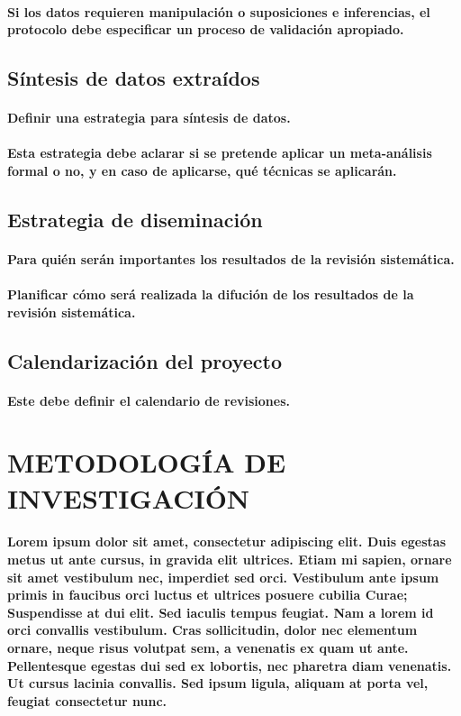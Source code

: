 \documentclass[10pt, twocolumn]{article}
\begin{document}
\paragraph{Si los datos requieren manipulación o suposiciones e inferencias, el protocolo debe especificar un proceso de validación apropiado.}

\subsection{Síntesis de datos extraídos}
\paragraph{Definir una estrategia para síntesis de datos.}
\paragraph{Esta estrategia debe aclarar si se pretende aplicar un meta-análisis formal o no, y en caso de aplicarse, qué técnicas se aplicarán.}

\subsection{Estrategia de diseminación}
\paragraph{Para quién serán importantes los resultados de la revisión sistemática.}
\paragraph{Planificar cómo será realizada la difución de los resultados de la revisión sistemática.}

\subsection{Calendarización del proyecto}
\paragraph{Este debe definir el calendario de revisiones.}

\section{METODOLOGÍA DE INVESTIGACIÓN}
\paragraph{Lorem ipsum dolor sit amet, consectetur adipiscing elit. Duis egestas metus ut ante cursus, in gravida elit ultrices. Etiam mi sapien, ornare sit amet vestibulum nec, imperdiet sed orci. Vestibulum ante ipsum primis in faucibus orci luctus et ultrices posuere cubilia Curae; Suspendisse at dui elit. Sed iaculis tempus feugiat. Nam a lorem id orci convallis vestibulum. Cras sollicitudin, dolor nec elementum ornare, neque risus volutpat sem, a venenatis ex quam ut ante. Pellentesque egestas dui sed ex lobortis, nec pharetra diam venenatis. Ut cursus lacinia convallis. Sed ipsum ligula, aliquam at porta vel, feugiat consectetur nunc.}
\end{document}
